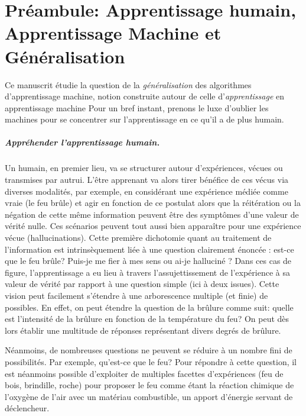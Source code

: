 \chapter*{Préambule: Apprentissage humain, Apprentissage Machine et Généralisation}
\mtcaddchapter


Ce manuscrit étudie la question de la \emph{généralisation} des algorithmes d'apprentissage machine, notion construite autour de celle d'\emph{apprentissage} en apprentissage machine
Pour un bref instant, prenons le luxe d'oublier les machines pour se concentrer sur l'apprentissage en ce qu'il a de plus humain.

\paragraph{Appréhender l'apprentissage humain.}
Un humain, en premier lieu, va se structurer autour d'expériences, vécues ou transmises par autrui. L'être apprenant va alors tirer bénéfice de ces vécus via diverses modalités, par exemple, en considérant une expérience médiée comme vraie (le feu brûle) et agir en fonction de ce postulat alors que la réitération ou la négation de cette même information peuvent être des symptômes d'une valeur de vérité nulle.  Ces scénarios peuvent tout aussi bien apparaître pour une expérience vécue (hallucinations). Cette première dichotomie quant au traitement de l'information est intrinsèquement liée à une question clairement énoncée : est-ce que le feu brûle? Puis-je me fier à mes sens ou ai-je halluciné ? Dans ces cas de figure, l'apprentissage a eu lieu à travers l'assujettissement de l'expérience à sa valeur de vérité par rapport à une question simple (ici à deux issues).  Cette vision peut facilement s'étendre à une arborescence multiple (et finie) de possibles. En effet, on peut étendre la question de la brûlure comme suit: quelle est l'intensité de la brûlure en fonction de la température du feu? On peut dès lors établir une multitude de réponses représentant divers degrés de brûlure.
  
 Néanmoins, de nombreuses questions ne peuvent se réduire à un nombre fini de possibilités. Par exemple, qu'est-ce que le feu? Pour répondre à cette question, il est néanmoins possible d'exploiter de multiples facettes d'expériences (feu de bois, brindille, roche) pour proposer le feu comme étant la réaction chimique de l'oxygène de l'air avec un matériau combustible, un apport d'énergie servant de déclencheur. 

